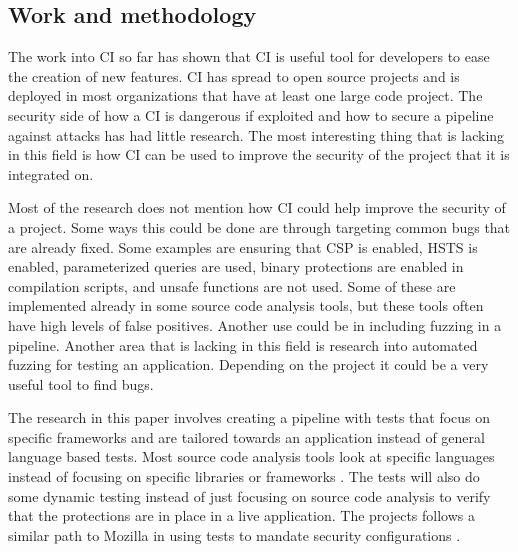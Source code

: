 \subsection{Work and methodology}
	The work into CI so far has shown that CI is useful tool for developers to ease the creation of new features. CI has spread to open source projects and is deployed in most organizations that have 
    at least one large code project. The security side of how a CI is dangerous if exploited and how to secure a pipeline against attacks has had little research. The most interesting thing that 
    is lacking in this field is how CI can be used to improve the security of the project that it is integrated on.
	
	Most of the research does not mention how CI could help improve the security of a project. Some ways this could be done are through targeting common bugs that are already fixed. Some examples
    are ensuring that CSP is enabled, HSTS is enabled, parameterized queries are used, binary protections are enabled in compilation scripts, and unsafe functions are not used. Some of these are
    implemented already in some source code analysis tools, but these tools often have high levels of false positives. Another use could be in including fuzzing in a pipeline. Another area that is
    lacking in this field is research into automated fuzzing for testing an application. Depending on the project it could be a very useful tool to find bugs.

    The research in this paper involves creating a pipeline with tests that focus on specific frameworks and are tailored towards an application instead of general language based tests. Most source
    code analysis tools look at specific languages instead of focusing on specific libraries or frameworks \cite{bandit, findbugs, findsecbugs}. The tests will also do some dynamic testing
    instead of just focusing on source code analysis to verify that the protections are in place in a live application. The projects follows a similar path to Mozilla in using tests to mandate security
    configurations \cite{Vehent}.
